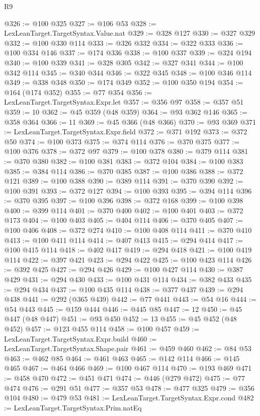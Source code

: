 \begin{lexlean}{R9}
\begin{coremodule}
@326 := @100 @325
@327 := @106 @53
@328 := LexLeanTarget.TargetSyntax.Value.nat
@329 := @328 @127
@330 := @327 @329
@332 := @100 @330 @114
@333 := @326 @332
@334 := @322 @333
@336 := @100 @334 @146
@337 := @174 @336
@338 := @100 @337
@339 := @324 @194
@340 := @100 @339
@341 := @328 @305
@342 := @327 @341
@344 := @100 @342 @114
@345 := @340 @344
@346 := @322 @345
@348 := @100 @346 @114
@349 := @338 @348
@350 := @174 @349
@352 := @100 @350 @194
@354 := @164 (@174 @352)
@355 := @77 @354
@356 := LexLeanTarget.TargetSyntax.Expr.let
@357 := @356 @97
@358 := @357 @51
@359 := 10
@362 := @45 @359 (@48 @359)
@364 := @93 @362 @146
@365 := @358 @364
@366 := 11
@369 := @45 @366 (@48 @366)
@370 := @93 @369
@371 := LexLeanTarget.TargetSyntax.Expr.field
@372 := @371 @192
@373 := @372 @50
@374 := @100 @373
@375 := @374 @114
@376 := @370 @375
@377 := @100 @376
@378 := @372 @97
@379 := @100 @378
@380 := @379 @114
@381 := @370 @380
@382 := @100 @381
@383 := @372 @104
@384 := @100 @383
@385 := @384 @114
@386 := @370 @385
@387 := @100 @386
@388 := @372 @121
@389 := @100 @388
@390 := @389 @114
@391 := @370 @390
@392 := @100 @391
@393 := @372 @127
@394 := @100 @393
@395 := @394 @114
@396 := @370 @395
@397 := @100 @396
@398 := @372 @168
@399 := @100 @398
@400 := @399 @114
@401 := @370 @400
@402 := @100 @401
@403 := @372 @173
@404 := @100 @403
@405 := @404 @114
@406 := @370 @405
@407 := @100 @406
@408 := @372 @274
@410 := @100 @408 @114
@411 := @370 @410
@413 := @100 @411 @114
@414 := @407 @413
@415 := @294 @414
@417 := @100 @415 @114
@418 := @402 @417
@419 := @294 @418
@421 := @100 @419 @114
@422 := @397 @421
@423 := @294 @422
@425 := @100 @423 @114
@426 := @392 @425
@427 := @294 @426
@429 := @100 @427 @114
@430 := @387 @429
@431 := @294 @430
@433 := @100 @431 @114
@434 := @382 @433
@435 := @294 @434
@437 := @100 @435 @114
@438 := @377 @437
@439 := @294 @438
@441 := @292 (@365 @439)
@442 := @77 @441
@443 := @54 @16
@444 := @54 @443
@445 := @159 @444
@446 := @445 @85
@447 := 12
@450 := @45 @447 (@48 @447)
@451 := @93 @450
@452 := 13
@455 := @45 @452 (@48 @452)
@457 := @123 @455 @114
@458 := @100 @457
@459 := LexLeanTarget.TargetSyntax.Expr.build
@460 := LexLeanTarget.TargetSyntax.Shape.pair
@461 := @459 @460
@462 := @84 @53
@463 := @462 @85
@464 := @461 @463
@465 := @142 @114
@466 := @145 @465
@467 := @464 @466
@469 := @100 @467 @114
@470 := @193 @469
@471 := @458 @470
@472 := @451 @471
@474 := @446 (@279 @472)
@475 := @77 @474
@476 := @291 @51
@477 := @357 @53
@478 := @477 @325
@479 := @356 @104
@480 := @479 @53
@481 := LexLeanTarget.TargetSyntax.Expr.cond
@482 := LexLeanTarget.TargetSyntax.Prim.natEq

\end{coremodule}
\end{lexlean}
